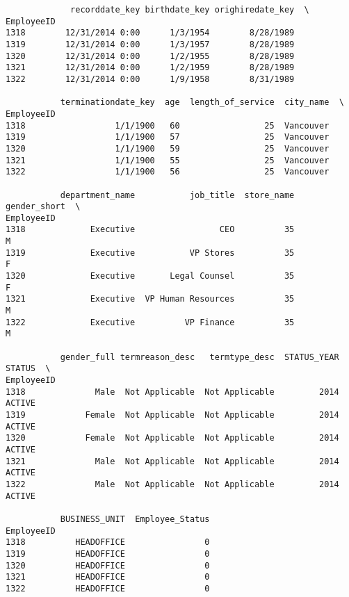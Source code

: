 \documentclass[11pt]{article}
\begin{document}
    
    \begin{verbatim}
             recorddate_key birthdate_key orighiredate_key  \
EmployeeID                                                   
1318        12/31/2014 0:00      1/3/1954        8/28/1989   
1319        12/31/2014 0:00      1/3/1957        8/28/1989   
1320        12/31/2014 0:00      1/2/1955        8/28/1989   
1321        12/31/2014 0:00      1/2/1959        8/28/1989   
1322        12/31/2014 0:00      1/9/1958        8/31/1989   

           terminationdate_key  age  length_of_service  city_name  \
EmployeeID                                                          
1318                  1/1/1900   60                 25  Vancouver   
1319                  1/1/1900   57                 25  Vancouver   
1320                  1/1/1900   59                 25  Vancouver   
1321                  1/1/1900   55                 25  Vancouver   
1322                  1/1/1900   56                 25  Vancouver   

           department_name           job_title  store_name gender_short  \
EmployeeID                                                                
1318             Executive                 CEO          35            M   
1319             Executive           VP Stores          35            F   
1320             Executive       Legal Counsel          35            F   
1321             Executive  VP Human Resources          35            M   
1322             Executive          VP Finance          35            M   

           gender_full termreason_desc   termtype_desc  STATUS_YEAR  STATUS  \
EmployeeID                                                                    
1318              Male  Not Applicable  Not Applicable         2014  ACTIVE   
1319            Female  Not Applicable  Not Applicable         2014  ACTIVE   
1320            Female  Not Applicable  Not Applicable         2014  ACTIVE   
1321              Male  Not Applicable  Not Applicable         2014  ACTIVE   
1322              Male  Not Applicable  Not Applicable         2014  ACTIVE   

           BUSINESS_UNIT  Employee_Status  
EmployeeID                                 
1318          HEADOFFICE                0  
1319          HEADOFFICE                0  
1320          HEADOFFICE                0  
1321          HEADOFFICE                0  
1322          HEADOFFICE                0  
    \end{verbatim}
\end{document}
